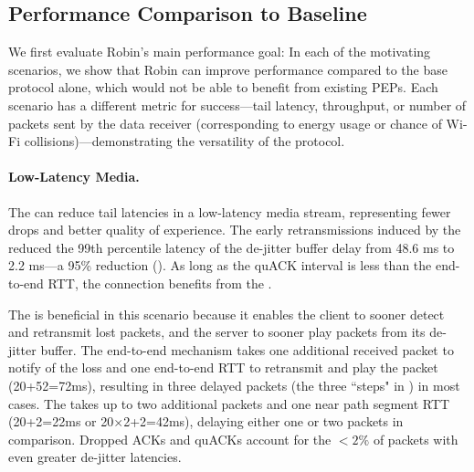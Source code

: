 \subsection{Performance Comparison to Baseline}

We first evaluate Robin's main performance goal: In each of the motivating
scenarios, we show that Robin can improve performance compared to the base
protocol alone, which would not be able to benefit from existing PEPs.
Each scenario has a different metric for success---tail latency, throughput,
or number of packets sent by the data receiver (corresponding to energy usage
or chance of Wi-Fi collisions)---demonstrating the versatility of the \sys
protocol.


\paragraph{Low-Latency Media.}
The \sys can reduce tail latencies in a low-latency media stream, representing
fewer drops and better quality of experience.
The early retransmissions induced by the \sys reduced the 99th percentile
latency of the de-jitter buffer delay from 48.6 ms to 2.2 ms---a 95\%
reduction ().
As long as the quACK interval is less than the end-to-end RTT, the connection
benefits from the \sys.

The \sys is beneficial in this scenario because it enables the client to sooner
detect and retransmit lost packets, and the server to sooner play packets from
its de-jitter buffer.
The end-to-end mechanism takes one additional received packet to notify of the
loss and
one end-to-end RTT to retransmit and play the packet (20+52=72ms), resulting in
three delayed packets (the three ``steps" in ) in most cases.
The \sys takes up to two additional packets and one near path segment RTT
(20+2=22ms or 20$\times$2+2=42ms), delaying either one or two packets in comparison.
Dropped ACKs and quACKs account for the $<2\%$ of packets with even greater
de-jitter latencies.

